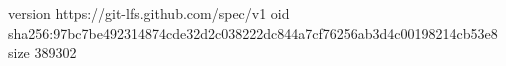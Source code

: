 version https://git-lfs.github.com/spec/v1
oid sha256:97bc7be492314874cde32d2c038222dc844a7cf76256ab3d4c00198214cb53e8
size 389302
